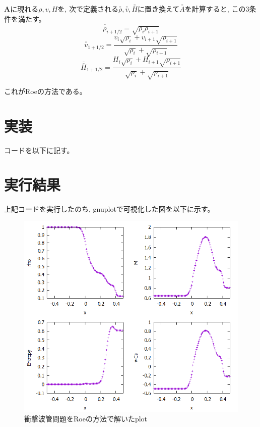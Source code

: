 \documentclass[dvipdfmx,b5paper]{jsarticle}
\newcommand{\oover}[1]{\overline{\overline{#1}}}
\begin{document}
$\bm{A}$に現れる$\rho, v, H$を, 次で定義される$\oover{\rho}, \oover{v}, \oover{H}$に置き換えて$\oover{A}$を計算すると, この3条件を満たす。
\begin{equation}
  \oover{\rho}_{i+1/2}=\sqrt{\rho_{i}\rho_{i+1}}
\end{equation}
\begin{equation}
  \oover{v}_{1+1/2}=\frac{v_i\sqrt{\rho_i}+v_{i+1}\sqrt{\rho_{i+1}}}{\sqrt{\rho_i}+\sqrt{\rho_{i+1}}}
\end{equation}
\begin{equation}
  \oover{H}_{1+1/2}=\frac{H_i\sqrt{\rho_i}+H_{i+1}\sqrt{\rho_{i+1}}}{\sqrt{\rho_i}+\sqrt{\rho_{i+1}}}
\end{equation}

これがRoeの方法である。

\section{実装}
コードを以下に記す。


\section{実行結果}

上記コードを実行したのち, gnuplotで可視化した図を以下に示す。
\begin{figure}[H]
  \centering
  \includegraphics[width = 0.8\linewidth]{../book/chap03/01_roe-1/out/01-2-2.png}
  \caption{衝撃波管問題をRoeの方法で解いたplot}
  \label{fig:roe}
\end{figure}
\end{document}
